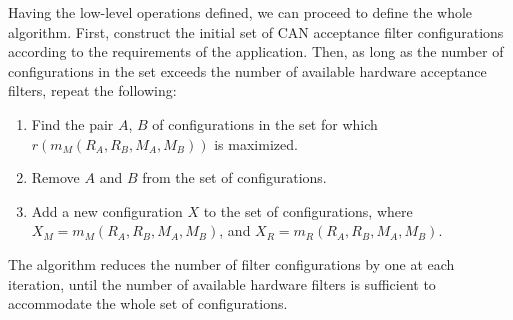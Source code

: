 \begin{remark}[breakable]
    Having the low-level operations defined, we can proceed to define the whole algorithm.
    First, construct the initial set of CAN acceptance filter configurations
    according to the requirements of the application.
    Then, as long as the number of configurations in the set exceeds the number of available
    hardware acceptance filters, repeat the following:
    \begin{enumerate}
        \item Find the pair $A$, $B$ of configurations in the set for which $r(m_M(R_A, R_B, M_A, M_B))$ is maximized.
        \item Remove $A$ and $B$ from the set of configurations.
        \item Add a new configuration $X$ to the set of configurations, where
        $X_M = m_M(R_A, R_B, M_A, M_B)$, and $X_R = m_R(R_A, R_B, M_A, M_B)$.
    \end{enumerate}

    The algorithm reduces the number of filter configurations by one at each iteration,
    until the number of available hardware filters is sufficient to accommodate the whole set of configurations.
\end{remark}
